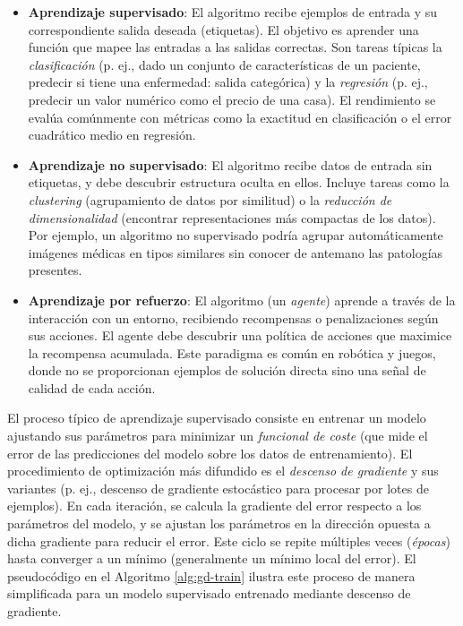 \documentclass[11pt,spanish,listoffigures,listoftables]{tfgetsinf}
\begin{document}
\begin{itemize}
    \item \textbf{Aprendizaje supervisado}: El algoritmo recibe ejemplos de entrada y su correspondiente salida deseada (etiquetas). 
    El objetivo es aprender una función que mapee las entradas a las salidas correctas. Son tareas típicas la \textit{clasificación} 
    (p. ej., dado un conjunto de características de un paciente, predecir si tiene una enfermedad: salida categórica) y la 
    \textit{regresión} (p. ej., predecir un valor numérico como el precio de una casa). El rendimiento se evalúa comúnmente con métricas
    como la exactitud en clasificación o el error cuadrático medio en regresión.

    \item \textbf{Aprendizaje no supervisado}: El algoritmo recibe datos de entrada sin etiquetas, y debe descubrir estructura oculta en 
    ellos. Incluye tareas como la \textit{clustering} (agrupamiento de datos por similitud) o la \textit{reducción de dimensionalidad} 
    (encontrar representaciones más compactas de los datos). Por ejemplo, un algoritmo no supervisado podría agrupar automáticamente 
    imágenes médicas en tipos similares sin conocer de antemano las patologías presentes.
    
    \item \textbf{Aprendizaje por refuerzo}: El algoritmo (un \textit{agente}) aprende a través de la interacción con un entorno, 
    recibiendo recompensas o penalizaciones según sus acciones. El agente debe descubrir una política de acciones que maximice la 
    recompensa acumulada. Este paradigma es común en robótica y juegos, donde no se proporcionan ejemplos de solución directa sino una 
    señal de calidad de cada acción.
    
\end{itemize}

El proceso típico de aprendizaje supervisado consiste en entrenar un modelo ajustando sus parámetros para minimizar un 
\textit{funcional de coste} (que mide el error de las predicciones del modelo sobre los datos de entrenamiento). El procedimiento de 
optimización más difundido es el \textit{descenso de gradiente} y sus variantes (p. ej., descenso de gradiente estocástico para procesar 
por lotes de ejemplos). En cada iteración, se calcula la gradiente del error respecto a los parámetros del modelo, y se ajustan los 
parámetros en la dirección opuesta a dicha gradiente para reducir el error. Este ciclo se repite múltiples veces (\textit{épocas}) 
hasta converger a un mínimo (generalmente un mínimo local del error). El pseudocódigo en el Algoritmo \ref{alg:gd-train} ilustra este 
proceso de manera simplificada para un modelo supervisado entrenado mediante descenso de gradiente.
\end{document}
